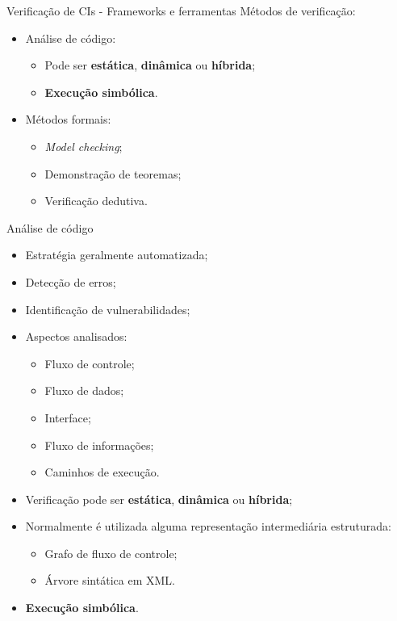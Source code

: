 \begin{frame}{Verificação de CIs - Frameworks e ferramentas}
	Métodos de verificação:
	\begin{itemize}
		\item Análise de código:
		\begin{itemize}
			\item Pode ser \textbf{estática}, \textbf{dinâmica} ou \textbf{híbrida};
			\item \textbf{Execução simbólica}.
		\end{itemize}
		\item Métodos formais:
		\begin{itemize}
			\item \textit{Model checking};
			\item Demonstração de teoremas;
			\item Verificação dedutiva.
		\end{itemize}		
	\end{itemize}
\end{frame}

\begin{frame}{Análise de código}
	\begin{itemize}
		\item Estratégia geralmente automatizada;
		\item Detecção de erros;
		\item Identificação de vulnerabilidades;
		\item Aspectos analisados:
		\begin{itemize}
			\item Fluxo de controle;
			\item Fluxo de dados;
			\item Interface;
			\item Fluxo de informações;
			\item Caminhos de execução.
		\end{itemize}
		\item Verificação pode ser \textbf{estática}, \textbf{dinâmica} ou \textbf{híbrida};
		\item Normalmente é utilizada alguma representação intermediária estruturada:
		\begin{itemize}
			\item Grafo de fluxo de controle;
			\item Árvore sintática em XML.
		\end{itemize}
		\item \textbf{Execução simbólica}.
	\end{itemize}
\end{frame}

